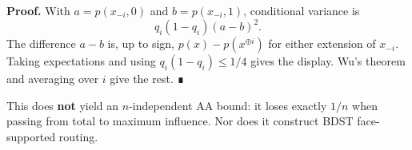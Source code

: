 \textbf{Proof.} With \(a=p(x_{-i},0)\) and \(b=p(x_{-i},1)\), conditional variance is
\[q_i(1-q_i)(a-b)^2.\]
The difference \(a-b\) is, up to sign, \(p(x)-p(x^{\oplus i})\) for either extension of \(x_{-i}\). Taking expectations and using \(q_i(1-q_i)\le1/4\) gives the display. Wu's theorem and averaging over \(i\) give the rest. ∎

This does \textbf{not} yield an \(n\)-independent AA bound: it loses exactly \(1/n\) when passing from total to maximum influence. Nor does it construct BDST face-supported routing.
